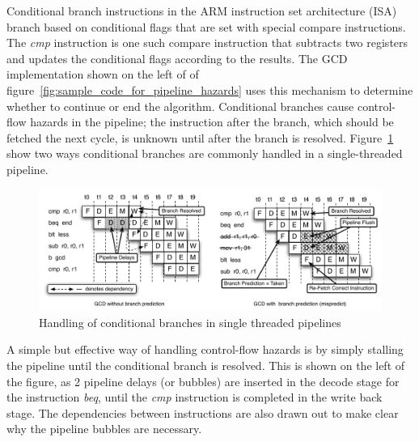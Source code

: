 Conditional branch instructions in the ARM instruction set architecture (ISA) branch based on conditional flags that are set with special compare instructions.
The \emph{cmp} instruction is one such compare instruction that subtracts two registers and updates the conditional flags according to the results.
The GCD implementation shown on the left of of figure~\ref{fig:sample_code_for_pipeline_hazards} uses this mechanism to determine whether to continue or end the algorithm.
Conditional branches cause control-flow hazards in the pipeline; the instruction after the branch, which should be fetched the next cycle, is unknown until after the branch is resolved.
Figure~\ref{fig:branch_execution_non_interleaved_pipeline} show two ways conditional branches are commonly handled in a single-threaded pipeline. 
\begin{figure}
\begin{center}
\includegraphics[scale=.58]{figs/branch_execution_non_interleaved_pipeline}
\end{center}
\vspace{-10pt}
\caption{Handling of conditional branches in single threaded pipelines}
\label{fig:branch_execution_non_interleaved_pipeline}
\end{figure}
A simple but effective way of handling control-flow hazards is by simply stalling the pipeline until the conditional branch is resolved.
This is shown on the left of the figure, as 2 pipeline delays (or bubbles) are inserted in the decode stage for the instruction \emph{beq}, until the \emph{cmp} instruction is completed in the write back stage.
The dependencies between instructions are also drawn out to make clear why the pipeline bubbles are necessary.

 

